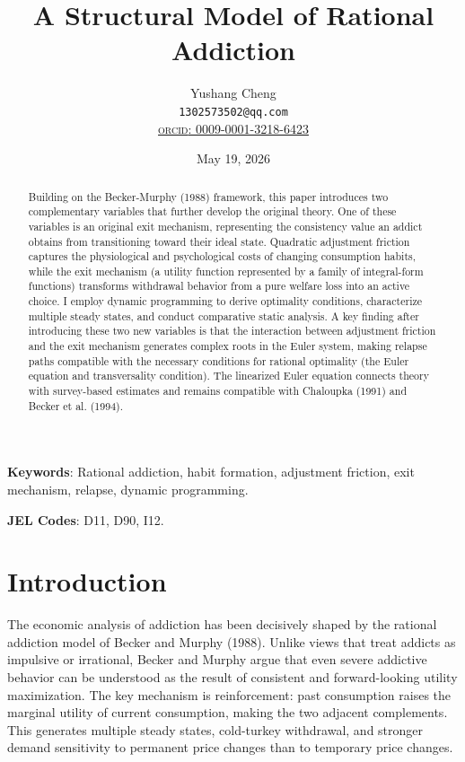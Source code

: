 \documentclass[12pt]{article}
\title{A Structural Model of Rational Addiction}
\author{Yushang Cheng\\
  \small\texttt{1302573502@qq.com}\\
  \small\href{https://orcid.org/0009-0001-3218-6423}{\textsc{orcid}: 0009-0001-3218-6423}}
\date{May 19, 2026}
\begin{document}
\maketitle

\begin{abstract}
Building on the Becker-Murphy (1988) framework, this paper introduces two complementary variables that further develop the original theory.
One of these variables is an original exit mechanism, representing the consistency value an addict obtains from transitioning toward their ideal state.
Quadratic adjustment friction captures the physiological and psychological costs of changing consumption habits, while the exit mechanism (a utility function represented by a family of integral-form functions)
transforms withdrawal behavior from a pure welfare loss into an active choice.
I employ dynamic programming to derive optimality conditions, characterize multiple steady states,
and conduct comparative static analysis. A key finding after introducing these two new variables is that the interaction between adjustment friction and the exit mechanism
generates complex roots in the Euler system, making relapse paths compatible with the necessary conditions for rational optimality (the Euler equation and transversality condition).
The linearized Euler equation connects theory with survey-based estimates and remains compatible with Chaloupka (1991) and Becker et al. (1994).
\end{abstract}

\textbf{Keywords}: Rational addiction, habit formation, adjustment friction, exit mechanism, relapse, dynamic programming.

\textbf{JEL Codes}: D11, D90, I12.

\section{Introduction}

The economic analysis of addiction has been decisively shaped by the rational addiction model of Becker and Murphy (1988). Unlike
views that treat addicts as impulsive or irrational, Becker and Murphy argue that even severe addictive behavior can
be understood as the result of consistent and forward-looking utility maximization. The key mechanism is reinforcement: past consumption raises the
marginal utility of current consumption, making the two adjacent complements. This generates multiple steady states, cold-turkey withdrawal,
and stronger demand sensitivity to permanent price changes than to temporary price changes.
\end{document}
